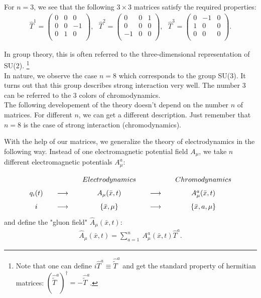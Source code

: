 For $n=3$, we see that the following $3 \times 3$ matrices satisfy the required properties:
\begin{align}
\hat{T}^1 = 
\begin{pmatrix}
0 & 0 & 0 \\
0 & 0 & - 1 \\
0 & 1 & 0 \\  
\end{pmatrix}, \ \ \
\hat{T}^2 = 
\begin{pmatrix}
0 & 0 & 1 \\
0 & 0 & 0 \\
- 1 & 0 & 0 \\  
\end{pmatrix}, \ \ \
\hat{T}^3 = 
\begin{pmatrix}
0 & - 1 & 0 \\
1 & 0 & 0 \\
0 & 0 & 0 \\  
\end{pmatrix}.
\end{align}

In group theory, this is often referred to the three-dimensional representation of SU(2). \footnote{Note that one can define $i \hat{T}^a \equiv \hat{\tilde{T}}^a$ and get the standard property of hermitian matrices: $( \hat{\tilde{T}}^a )^\dag = - \hat{\tilde{T}}^a$.} \\
 
In nature, we observe the case $n=8$ which corresponds to the group SU(3). It turns out that this group describes strong interaction very well. The number 3 can be referred to the 3 colors of chromodynamics. \\

The following developement of the theory doesn't depend on the number $n$ of matrices. For different $n$, we can get a different description. Just remember that $n=8$ is the case of strong interaction (chromodynamics).

\pagebreak

With the help of our matrices, we generalize the theory of electrodynamics in the following way. Instead of one electromagnetic potential field $A_{\mu}$, we take $n$ different electromagnetic potentials $A_{\mu}^a$:
\begin{align*}
\arraycolsep=10pt\def\arraystretch{1.6}
\begin{array}{ccccc}
 &  & Electrodynamics & & Chromodynamics \\
q_i(t) & \longrightarrow & A_{\mu}(\bar{x},t) & \longrightarrow & A_{\mu}^a(\bar{x},t) \\
i & \longrightarrow & \{ \bar{x},\mu \} & \longrightarrow & \{ \bar{x},a,\mu \}
\end{array}
\end{align*}
and define the "gluon field" $\hat{A}_{\mu}(\bar{x},t)$:
\begin{align}
\hat{A}_{\mu}(\bar{x},t) = \sum_{a=1}^n \ A_{\mu}^a(\bar{x},t) \hat{T}^a.
\end{align}

